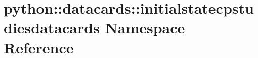 \hypertarget{namespacepython_1_1datacards_1_1initialstatecpstudiesdatacards}{
\section{python::datacards::initialstatecpstudiesdatacards Namespace Reference}
\label{namespacepython_1_1datacards_1_1initialstatecpstudiesdatacards}
}
